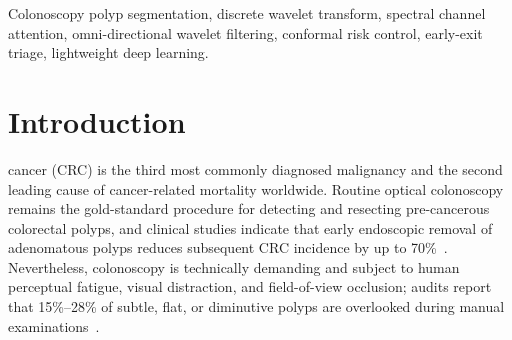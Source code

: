 \documentclass[journal]{IEEEtran}
\begin{document}
\begin{IEEEkeywords}
Colonoscopy polyp segmentation, discrete wavelet transform, spectral channel attention, omni-directional wavelet filtering, conformal risk control, early-exit triage, lightweight deep learning.
\end{IEEEkeywords}

\section{Introduction}
 cancer (CRC) is the third most commonly diagnosed malignancy and the second leading cause of cancer-related mortality worldwide. Routine optical colonoscopy remains the gold-standard procedure for detecting and resecting pre-cancerous colorectal polyps, and clinical studies indicate that early endoscopic removal of adenomatous polyps reduces subsequent CRC incidence by up to 70\%~\cite{ronneberger2015u,oktay2018attention}. Nevertheless, colonoscopy is technically demanding and subject to human perceptual fatigue, visual distraction, and field-of-view occlusion; audits report that 15\%--28\% of subtle, flat, or diminutive polyps are overlooked during manual examinations~\cite{ma2024medsam}.
\end{document}

